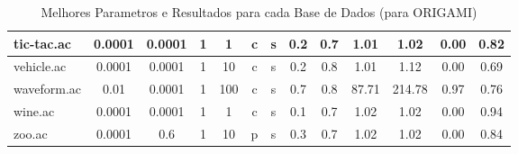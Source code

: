 \begin{table}[htbp]
\begin{tabular}{|l|c|c|c|c|c|c|c|c||c|c|c|c|}
		\hline
		tic-tac.ac     & 0.0001   & 0.0001      & 1              & 1        & c                   & s        & 0.2    & 0.7   & 1.01           & 1.02           & 0.00           & 0.82           \\
		\hline
		vehicle.ac     & 0.0001   & 0.0001      & 1              & 10       & c                   & s        & 0.2    & 0.8   & 1.01           & 1.12           & 0.00           & 0.69           \\
		\hline
		waveform.ac    & 0.01     & 0.0001      & 1              & 100      & c                   & s        & 0.7    & 0.8   & 87.71          & 214.78         & 0.97           & 0.76           \\
		\hline
		wine.ac        & 0.0001   & 0.0001      & 1              & 1        & c                   & s        & 0.1    & 0.7   & 1.02           & 1.02           & 0.00           & 0.94           \\
		\hline
		zoo.ac         & 0.0001   & 0.6         & 1              & 10       & p                   & s        & 0.3    & 0.7   & 1.02           & 1.02           & 0.00           & 0.84           \\
		\hline
		\end{tabular}
	\caption{Melhores Parametros e Resultados para cada Base de Dados (para ORIGAMI)}
	\label{tab:best_runs_for_each_db_origami}
\end{table}